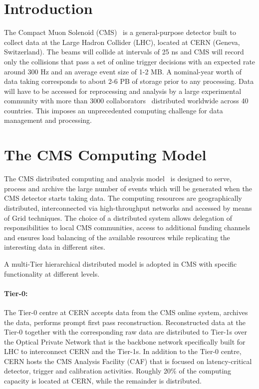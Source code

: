 \section{Introduction}
\label{intro}
The Compact Muon Solenoid (CMS)~\cite{RefCMS} is a general-purpose detector
built to collect data at the Large Hadron Collider (LHC), located at CERN
(Geneva, Switzerland).
The beams will collide at intervals of 25 ns and CMS will record only the collisions that pass a set of %
online trigger decisions with an expected rate around 300 Hz and an
average event size of 1-2 MB. A nominal-year worth of data taking 
corresponds to about 2-6 PB of storage prior to any processing.
Data will have to be accessed for reprocessing and analysis by a
large experimental community with more than 3000 collaborators~\cite{RefCMSCollaboration} distributed
worldwide across 40 countries. This imposes an unprecedented computing
challenge for data management and processing.

\section{The CMS Computing Model}
\label{sec:2}
The CMS distributed computing and analysis model~\cite{RefCM} is designed to serve, process and archive the %
large number of events which will be generated when the CMS detector starts taking data. The computing resources are geographically distributed, interconnected via high-throughput networks and accessed by means of Grid techniques. 
The choice of a distributed system allows delegation of responsibilities to local CMS communities, access to additional funding channels and ensures load balancing of the available resources while replicating the interesting data in different sites.


A multi-Tier hierarchical distributed model is adopted in CMS with specific functionality at different levels.
\paragraph{Tier-0:}
The Tier-0 centre at CERN accepts data from the CMS online system, archives the data, performs prompt first pass reconstruction. Reconstructed data at the Tier-0 together with the corresponding raw data are distributed to Tier-1s over the Optical Private Network that is the backbone network specifically built for LHC to interconnect CERN and the Tier-1s.
In addition to the Tier-0 centre, CERN hosts the CMS Analysis Facility (CAF) that is focused on latency-critical detector, trigger and calibration activities.
Roughly 20\% of the computing capacity is located at CERN, while the remainder is distributed.

